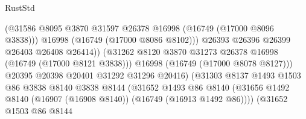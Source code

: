 \begin{lexlean}{RustStd}
\begin{coremodule}
                                              (@31586
                                                @8095
                                                @3870
                                                @31597
                                                @26378
                                                @16998
                                                (@16749 (@17000 @8096 @3838)))
                                              @16998
                                              (@16749 (@17000 @8086 @8102)))
                                            @26393
                                            @26396
                                            @26399
                                            @26403
                                            @26408
                                            @26414))
                                        (@31262
                                          @8120
                                          @3870
                                          @31273
                                          @26378
                                          @16998
                                          (@16749 (@17000 @8121 @3838)))
                                        @16998
                                        (@16749 (@17000 @8078 @8127)))
                                      @20395
                                      @20398
                                      @20401
                                      @31292
                                      @31296
                                      @20416)
                                    (@31303
                                      @8137
                                      @1493
                                      @1503
                                      @86
                                      @3838
                                      @8140
                                      @3838
                                      @8144
                                      (@31652
                                        @1493
                                        @86
                                        @8140
                                        (@31656
                                          @1492
                                          @8140
                                          (@16907 (@16908 @8140))
                                          (@16749 (@16913 @1492 @86))))
                                      (@31652
                                        @1503
                                        @86
                                        @8144

\end{coremodule}
\end{lexlean}
